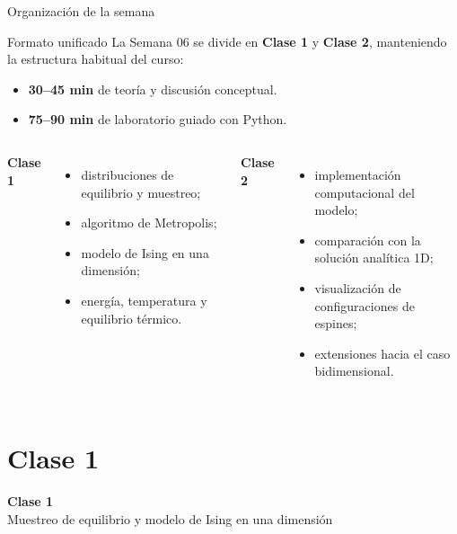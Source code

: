 




\frame{\titlepage}

\begin{frame}{Organización de la semana}
\begin{block}{Formato unificado}
La Semana 06 se divide en \textbf{Clase 1} y \textbf{Clase 2}, manteniendo la estructura habitual del curso:
\begin{itemize}
    \item \textbf{30--45 min} de teoría y discusión conceptual.
    \item \textbf{75--90 min} de laboratorio guiado con Python.
\end{itemize}
\end{block}

\vspace{0.25cm}
\begin{columns}[T,onlytextwidth]
\textbf{Clase 1}
\begin{itemize}
    \item distribuciones de equilibrio y muestreo;
    \item algoritmo de Metropolis;
    \item modelo de Ising en una dimensión;
    \item energía, temperatura y equilibrio térmico.
\end{itemize}

\textbf{Clase 2}
\begin{itemize}
    \item implementación computacional del modelo;
    \item comparación con la solución analítica 1D;
    \item visualización de configuraciones de espines;
    \item extensiones hacia el caso bidimensional.
\end{itemize}
\end{columns}
\end{frame}

\section{Clase 1}

\begin{frame}[plain]
\centering
\vfill
{\Huge \bfseries Clase 1}\\[0.4cm]
{\Large Muestreo de equilibrio y modelo de Ising en una dimensión}
\vfill
\end{frame}

